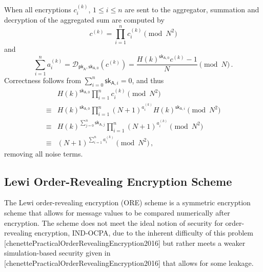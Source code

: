 When all encryptions $c^{(k)}_{i}$, $1\leq i\leq n$ are sent to the aggregator, summation and decryption of the aggregated sum are computed by
\begin{equation}\label{eq:prelims:joye_libert_agg_sum}
    c^{(k)} = \prod^{n}_{i=1}c^{(k)}_{i} \pmod{N^2} 
\end{equation}
and
\begin{equation}\label{eq:prelims:joye_libert_agg_dec}
    \sum^{n}_{i=1}a^{(k)}_{i} = \mathcal{D}_{\mathsf{pk}_{\mathsf{A}},\mathsf{sk}_{\mathsf{A},0}}\left(c^{(k)}\right) = \frac{H(k)^{\mathsf{sk}_{\mathsf{A},0}}c^{(k)}-1}{N} \pmod{N}\,.
\end{equation}
Correctness follows from $\sum^{n}_{i=0}\mathsf{sk}_{\mathsf{A},i} = 0$, and thus
\begin{equation*}
    \begin{split}
        &H(k)^{\mathsf{sk}_{\mathsf{A},0}}\prod^{n}_{i=1}c^{(k)}_{i} \pmod{N^2} \\
        \equiv &H(k)^{\mathsf{sk}_{\mathsf{A},0}}\prod^{n}_{i=1}(N+1)^{a^{(k)}_{i}} H(k)^{\mathsf{sk}_{\mathsf{A},i}} \pmod{N^2} \\
        \equiv &H(k)^{\sum^n_{j=0}\mathsf{sk}_{\mathsf{A},j}} \prod^{n}_{i=1}(N+1)^{a^{(k)}_{i}} \pmod{N^2} \\
        \equiv &(N+1)^{\sum^n_{i=1}a^{(k)}_{i}} \pmod{N^2}\,,
    \end{split}
\end{equation*}
removing all noise terms.

% 
% 

\subsection{Lewi Order-Revealing Encryption Scheme}\label{subsec:prelims:lewi_ore}
The Lewi order-revealing encryption (ORE) scheme is a symmetric encryption scheme that allows for message values to be compared numerically after encryption. The scheme does not meet the ideal notion of security for order-revealing encryption, IND-OCPA, due to the inherent difficulty of this problem [chenettePracticalOrderRevealingEncryption2016] but rather meets a weaker simulation-based security given in [chenettePracticalOrderRevealingEncryption2016] that allows for some leakage.


